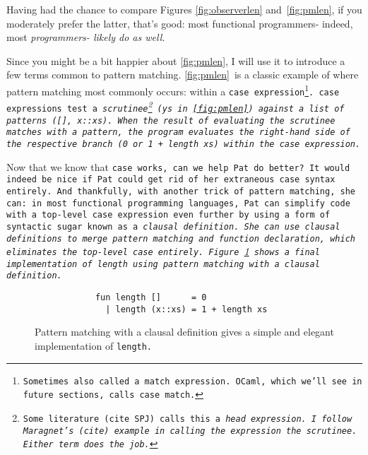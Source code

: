 \documentclass[manuscript,screen,review, 12pt]{acmart}
\begin{document}
    Having had the chance to compare Figures \ref{fig:observerlen}
    and~\ref{fig:pmlen}, if you moderately prefer the latter, that's good: most
    functional programmers- indeed, most \it{programmers}- likely do as well. 

    Since you might be a bit happier about \ref{fig:pmlen}, I will use it to
    introduce a few terms common to pattern matching. \ref{fig:pmlen}~is a
    classic example of where pattern matching most commonly occurs: within a
    \tt{case} expression\footnote{Sometimes also called a \tt{match expression}.
    OCaml, which we'll see in future sections, calls \tt{case} \tt{match}.}.
    \tt{case} expressions test a \it{scrutinee}\footnote{Some literature (cite
    SPJ) calls this a \it{head expression}. I follow Maragnet's (cite) example
    in calling the expression the \it{scrutinee}. Either term does the job.}
    (\tt{ys} in~\ref{fig:pmlen}) against a list of patterns (\tt{[]},
    \tt{x::xs}). When the result of evaluating the scrutinee matches with a
    pattern, the program evaluates the right-hand side of the respective branch
    (\tt{0} or \tt{1 + length xs}) within the \tt{case} expression. 

    Now that we know that \tt{case} works, can we help Pat do better? It would
    indeed be nice if Pat could get rid of her extraneous \tt{case} syntax
    entirely. And thankfully, with another trick of pattern matching, she can:
    in most functional programming languages, Pat can simplify code with a
    top-level \tt{case} expression even further by using a form of syntactic
    sugar known as a \it{clausal definition}. She can use clausal definitions to
    merge pattern matching and function declaration, which eliminates the
    top-level \tt{case} entirely. Figure~\ref{fig:pmclausallen} shows a final
    implementation of \tt{length} using pattern matching with a clausal
    definition. 
    
    

    \begin{figure}[ht]
    \smllst
    \begin{verbatim}
            fun length []      = 0
              | length (x::xs) = 1 + length xs
        \end{verbatim}
    \caption{Pattern matching with a clausal definition gives a simple and 
             elegant implementation of \tt{length}.}
    \label{fig:pmclausallen}
    \end{figure}
    
\end{document}
